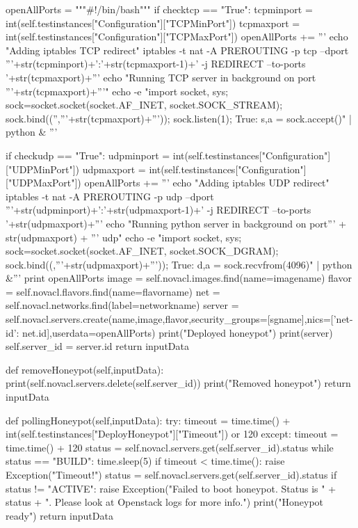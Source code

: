 \begin{python}
		openAllPorts = """#!/bin/bash\n"""
		if checktcp == "True":
			tcpminport = int(self.testinstances["Configuration"]["TCPMinPort"])
			tcpmaxport = int(self.testinstances["Configuration"]["TCPMaxPort"])
			openAllPorts += '''
			echo "Adding iptables TCP redirect\n"
			iptables -t nat -A PREROUTING -p tcp --dport '''+str(tcpminport)+':'+str(tcpmaxport-1)+' -j REDIRECT --to-ports '+str(tcpmaxport)+'''\n
			echo "Running TCP server in background on port '''+str(tcpmaxport)+'''\n"
			echo -e "import socket, sys; sock=socket.socket(socket.AF_INET, socket.SOCK_STREAM); sock.bind(('','''+str(tcpmaxport)+''')); sock.listen(1); \nwhile True: s,a = sock.accept()\n" | python &
			\n'''

		if checkudp == "True":
			udpminport = int(self.testinstances["Configuration"]["UDPMinPort"])
			udpmaxport = int(self.testinstances["Configuration"]["UDPMaxPort"])
			openAllPorts += '''
			echo "Adding iptables UDP redirect"\n
			iptables -t nat -A PREROUTING -p udp --dport '''+str(udpminport)+':'+str(udpmaxport-1)+' -j REDIRECT --to-ports '+str(udpmaxport)+'''\n
			echo "Running python server in background on port''' + str(udpmaxport) + ''' udp\n"
			echo -e "import socket, sys; sock=socket.socket(socket.AF_INET, socket.SOCK_DGRAM); sock.bind((,'''+str(udpmaxport)+''')); \nwhile True: d,a = sock.recvfrom(4096)\n" | python &'''
		print openAllPorts
		image = self.novacl.images.find(name=imagename)
		flavor = self.novacl.flavors.find(name=flavorname)
		net = self.novacl.networks.find(label=networkname)
		server = self.novacl.servers.create(name,image,flavor,security_groups=[sgname],nics=[{'net-id': net.id}],userdata=openAllPorts)
		print("Deployed honeypot")
		print(server)
		self.server_id = server.id
		return inputData

	def removeHoneypot(self,inputData):
		print(self.novacl.servers.delete(self.server_id))
		print("Removed honeypot")
		return inputData

	def pollingHoneypot(self,inputData):
		try:
			timeout = time.time() + int(self.testinstances["DeployHoneypot"]["Timeout"]) or 120
		except:
			timeout = time.time() + 120
		status = self.novacl.servers.get(self.server_id).status
		while status == "BUILD":
			time.sleep(5)
			if timeout < time.time():
				raise Exception("Timeout!")
			status = self.novacl.servers.get(self.server_id).status
		if status != "ACTIVE":
			raise Exception("Failed to boot honeypot. Status is " + status + ". Please look at Openstack logs for more info.")
		print("Honeypot ready")
		return inputData



\end{python}

